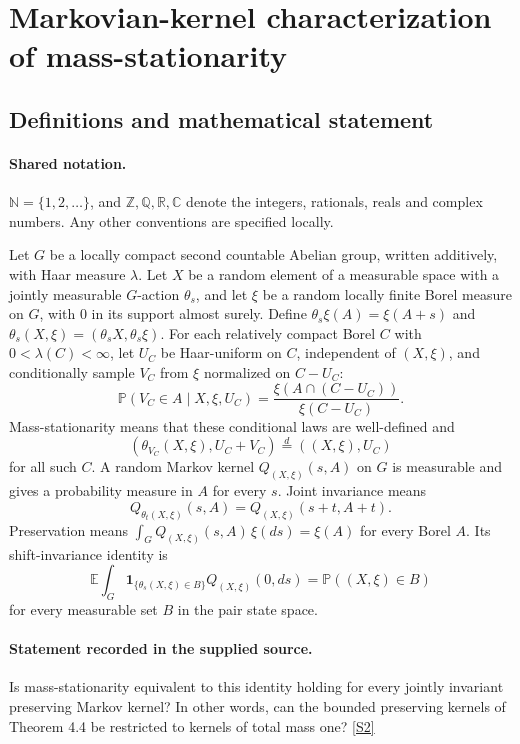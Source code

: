 \documentclass[11pt]{article}
\newcommand{\sref}[2]{\hyperlink{source:#1:#2}{[S#2]}}
\begin{document}
\section{Markovian-kernel characterization of mass-stationarity}\label{statement}

\subsection{Definitions and mathematical statement}

\paragraph{Shared notation.}$\mathbb N=\{1,2,\ldots\}$, and $\mathbb Z,\mathbb Q,\mathbb R,\mathbb C$ denote the integers, rationals, reals and complex numbers. Any other conventions are specified locally.


Let $G$ be a locally compact second countable Abelian group, written additively, with Haar measure $\lambda$. Let $X$ be a random element of a measurable space with a jointly measurable $G$-action $\theta_s$, and let $\xi$ be a random locally finite Borel measure on $G$, with $0$ in its support almost surely. Define $\theta_s\xi(A)=\xi(A+s)$ and $\theta_s(X,\xi)=(\theta_sX,\theta_s\xi)$. For each relatively compact Borel $C$ with $0<\lambda(C)<\infty$, let $U_C$ be Haar-uniform on $C$, independent of $(X,\xi)$, and conditionally sample $V_C$ from $\xi$ normalized on $C-U_C$:
\[\mathbb P(V_C\in A\mid X,\xi,U_C)=\frac{\xi(A\cap(C-U_C))}{\xi(C-U_C)}.\]
Mass-stationarity means that these conditional laws are well-defined and
\[(\theta_{V_C}(X,\xi),U_C+V_C)\stackrel d=((X,\xi),U_C)\]
for all such $C$. A random Markov kernel $Q_{(X,\xi)}(s,A)$ on $G$ is measurable and gives a probability measure in $A$ for every $s$. Joint invariance means
\[Q_{\theta_t(X,\xi)}(s,A)=Q_{(X,\xi)}(s+t,A+t).\]
Preservation means $\int_GQ_{(X,\xi)}(s,A)\,\xi(ds)=\xi(A)$ for every Borel $A$. Its shift-invariance identity is
\[\mathbb E\int_G\mathbf1_{\{\theta_s(X,\xi)\in B\}}Q_{(X,\xi)}(0,ds)=\mathbb P((X,\xi)\in B)\]
for every measurable set $B$ in the pair state space.
\paragraph{Statement recorded in the supplied source.}
Is mass-stationarity equivalent to this identity holding for every jointly invariant preserving Markov kernel? In other words, can the bounded preserving kernels of Theorem 4.4 be restricted to kernels of total mass one? \sref{statement}{2}
\end{document}
